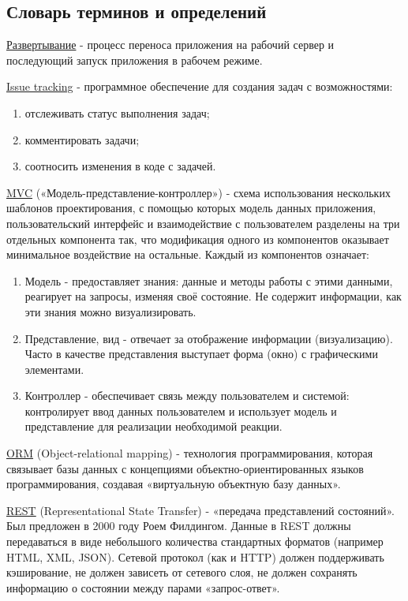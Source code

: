 \subsection*{Словарь терминов и определений}
\underline{Развертывание} - процесс переноса приложения на рабочий сервер и
последующий запуск приложения в рабочем режиме.

\underline{Issue tracking} - программное обеспечение для создания задач с
возможностями:
\begin{enumerate}
  \item отслеживать статус выполнения задач;
  \item комментировать задачи;
  \item соотносить изменения в коде с задачей.
\end{enumerate}

\underline{MVC} («Модель-представление-контроллер») - схема использования
нескольких шаблонов проектирования, с помощью которых модель данных приложения,
пользовательский интерфейс и взаимодействие с пользователем разделены на три
отдельных компонента так, что модификация одного из компонентов оказывает
минимальное воздействие на остальные.  Каждый из компонентов означает:
\begin{enumerate}
  \item Модель - предоставляет знания: данные и методы работы с этими данными, реагирует на запросы, изменяя своё состояние. Не содержит информации, как эти знания можно визуализировать.
  \item Представление, вид - отвечает за отображение информации (визуализацию).
Часто в качестве представления выступает форма (окно) с графическими элементами.
  \item Контроллер - обеспечивает связь между пользователем и системой:
контролирует ввод данных пользователем и использует модель и представление для реализации необходимой реакции.   
\end{enumerate}

\underline{ORM} (Object-relational mapping) - технология программирования,
которая связывает базы данных с концепциями объектно-ориентированных языков
программирования, создавая «виртуальную объектную базу данных».

\underline{REST} (Representational State Transfer) - «передача представлений
состояний».
Был предложен в 2000 году Роем Филдингом. Данные в REST должны передаваться в
виде небольшого количества стандартных форматов (например HTML, XML, JSON).
Сетевой протокол (как и HTTP) должен поддерживать кэширование, не должен
зависеть от сетевого слоя, не должен сохранять информацию о состоянии между
парами «запрос-ответ».

